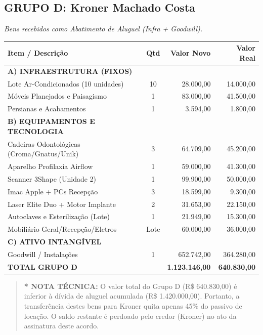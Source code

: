 \documentclass[12pt, a4paper]{article}
\newcommand{\reais}[1]{R\$ #1}
\begin{document}
\subsection*{GRUPO D: Kroner Machado Costa}
\textit{Bens recebidos como Abatimento de Aluguel (Infra + Goodwill).}

\begin{longtable}{>{\raggedright\arraybackslash}p{8cm} c r r}
    \toprule
    \rowcolor{tableHeader} \textbf{Item / Descrição} & \textbf{Qtd} & \textbf{Valor Novo} & \textbf{Valor Real} \\
    \midrule
    \endhead
    \textbf{A) INFRAESTRUTURA (FIXOS)} & & & \\
    Lote Ar-Condicionados (10 unidades) & 10 & 28.000,00 & 14.000,00 \\
    Móveis Planejados e Paisagismo & 1 & 83.000,00 & 41.500,00 \\
    Persianas e Acabamentos & 1 & 3.594,00 & 1.800,00 \\
    
    \textbf{B) EQUIPAMENTOS E TECNOLOGIA} & & & \\
    Cadeiras Odontológicas (Croma/Gnatus/Unik) & 3 & 64.709,00 & 45.200,00 \\
    Aparelho Profilaxia Airflow & 1 & 59.000,00 & 41.300,00 \\
    Scanner 3Shape (Unidade 2) & 1 & 99.900,00 & 50.000,00 \\
    Imac Apple + PCs Recepção & 3 & 18.599,00 & 9.300,00 \\
    Laser Elite Duo + Motor Implante & 2 & 31.653,00 & 22.150,00 \\
    Autoclaves e Esterilização (Lote) & 1 & 21.949,00 & 15.300,00 \\
    Mobiliário Geral/Recepção/Eletros & Lote & 60.000,00 & 36.000,00 \\
    
    \textbf{C) ATIVO INTANGÍVEL} & & & \\
    Goodwill / Instalações & 1 & 652.742,00 & 364.280,00 \\
    \midrule
    \rowcolor{lightGray} \textbf{TOTAL GRUPO D} & & \textbf{1.123.146,00} & \textbf{640.830,00} \\
    \bottomrule
\end{longtable}

\vspace{-0.3cm}
\begin{quote}
    \footnotesize \textbf{* NOTA TÉCNICA:} O valor total do Grupo D (\reais{640.830,00}) é inferior à dívida de aluguel acumulada (\reais{1.420.000,00}). Portanto, a transferência destes bens para Kroner quita apenas 45\% do passivo de locação. O saldo restante é perdoado pelo credor (Kroner) no ato da assinatura deste acordo.
\end{quote}
\newpage
\end{document}
